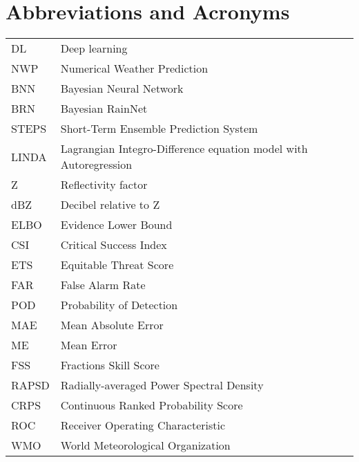 \chapter*{Abbreviations and Acronyms}


\noindent
\begin{longtable}{@{}p{}p{}@{}}
DL & Deep learning \\
NWP & Numerical Weather Prediction \\
BNN & Bayesian Neural Network \\
BRN & Bayesian RainNet \\
STEPS & Short-Term Ensemble Prediction System \\
LINDA & Lagrangian Integro-Difference equation model with Autoregression\\
Z & Reflectivity factor \\
dBZ & Decibel relative to Z \\
ELBO & Evidence Lower Bound \\
CSI & Critical Success Index \\
ETS & Equitable Threat Score \\
FAR & False Alarm Rate \\
POD & Probability of Detection \\
MAE & Mean Absolute Error \\
ME & Mean Error \\
FSS & Fractions Skill Score \\
RAPSD & Radially-averaged Power Spectral Density \\
CRPS & Continuous Ranked Probability Score \\
ROC & Receiver Operating Characteristic \\
WMO & World Meteorological Organization \\

 

\end{longtable}

